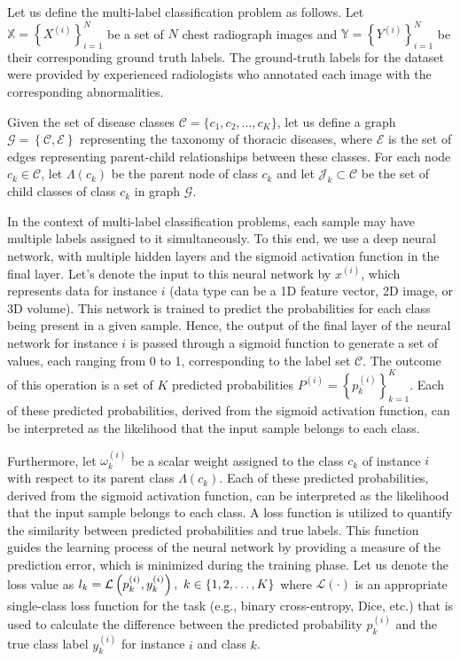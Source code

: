 \documentclass[review,1p,times,numbers]{elsarticle}
\begin{document}
%
Let us define the multi-label classification problem as follows. Let $\mathbb{X} = {\left\{X^{(i)}\right\}}_{i=1}^{N} $ be a set of $N $ chest radiograph images and $\mathbb{Y} = {\left\{Y^{(i)}\right\}}_{i=1}^{N} $ be their corresponding ground truth labels. The ground-truth labels for the dataset were provided by experienced radiologists who annotated each image with the corresponding abnormalities.

Given the set of disease classes $\mathcal{C} = \{c_1,c_2,\dots,c_K\} $, let us define a  graph $\mathcal{G}=\left\{\mathcal{C},\mathcal{E}\right\} $ representing the taxonomy of thoracic diseases, where $\mathcal{E}$ is the set of edges representing parent-child relationships between these classes. For each node $c_k \in \mathcal{C} $, let $\Lambda (c_k)$ be the parent node of class $c_k $ and let $\mathcal{J}_k\subset \mathcal{C} $ be the set of child classes of class $c_k $ in graph $\mathcal{G}$.

In the context of multi-label classification problems, each sample may have multiple labels assigned to it simultaneously. To this end, we use a deep neural network, with multiple hidden layers and the sigmoid activation function in the final layer. Let's denote the input to this neural network by $x^{(i)}$, which represents data for instance $i$ (data type can be a 1D feature vector, 2D image, or 3D volume). This network is trained to predict the probabilities for each class being present in a given sample. Hence, the output of the final layer of the neural network for instance $i$ is passed through a sigmoid function to generate a set of values, each ranging from 0 to 1, corresponding to the label set $\mathcal{C} $.
The outcome of this operation is a set of $K $ predicted probabilities $P^{(i)}={\left\{p_k^{(i)}\right\}}_{k=1}^{K} $. Each of these predicted probabilities, derived from the sigmoid activation function, can be interpreted as the likelihood that the input sample belongs to each class.

Furthermore, let $\omega_k^{(i)} $ be a scalar weight assigned to the class $c_k $ of instance $i $ with respect to its parent class $\Lambda (c_k)$.
Each of these predicted probabilities, derived from the sigmoid activation function, can be interpreted as the likelihood that the input sample belongs to each class. A loss function is utilized to quantify the similarity between predicted probabilities and true labels. This function guides the learning process of the neural network by providing a measure of the prediction error, which is minimized during the training phase.
Let us denote the loss value as $l_k = \mathcal{L} \left(p_k^{(i)},y_k^{(i)}\right),\hspace{0.33em}k \in \{1,2,\dots,K\} $ where $\mathcal{L}(\cdot) $ is an appropriate single-class loss function for the task (e.g., binary cross-entropy, Dice, etc.) that is used to calculate the difference between the predicted probability $p_k^{(i)} $ and the true class label $y_k^{(i)} $ for instance $i$ and class $k $.
\end{document}
